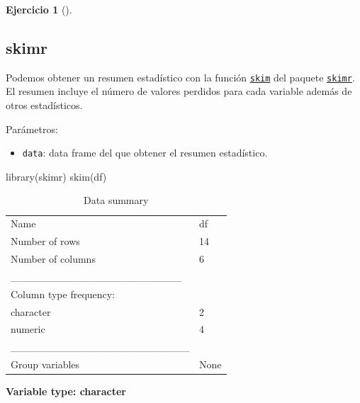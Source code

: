 \documentclass[
  spanish,
  a4paper,
]{scrreport}
\newenvironment{Shaded}{\begin{snugshade}}{\end{snugshade}}
\newcommand{\FunctionTok}[1]{\textcolor[rgb]{0.28,0.35,0.67}{#1}}
\newcommand{\NormalTok}[1]{\textcolor[rgb]{0.00,0.23,0.31}{#1}}
\providecommand{\tightlist}{%
  \setlength{\itemsep}{0pt}\setlength{\parskip}{0pt}}
\theoremstyle{definition}
\newtheorem{exercise}{Ejercicio}[chapter]
\theoremstyle{remark}
\begin{document}
\begin{exercise}[]
\begin{enumerate}
\begin{tcolorbox}
  \section{skimr}

  Podemos obtener un resumen estadístico con la función
  \href{https://www.rdocumentation.org/packages/skimr/versions/2.2.1/topics/skim}{\texttt{skim}}
  del paquete
  \href{https://www.rdocumentation.org/packages/skimr}{\texttt{skimr}}.
  El resumen incluye el número de valores perdidos para cada variable
  además de otros estadísticos.

  Parámetros:

  \begin{itemize}
  \tightlist
  \item
    \texttt{data}: data frame del que obtener el resumen estadístico.
  \end{itemize}

\begin{Shaded}
\begin{Highlighting}[]
\FunctionTok{library}\NormalTok{(skimr)}
\FunctionTok{skim}\NormalTok{(df)}
\end{Highlighting}
\end{Shaded}

  \begin{longtable}[]{@{}ll@{}}
  \caption{Data summary}\tabularnewline
  \toprule\noalign{}
  \endfirsthead
  \endhead
  \bottomrule\noalign{}
  \endlastfoot
  Name & df \\
  Number of rows & 14 \\
  Number of columns & 6 \\
  \_\_\_\_\_\_\_\_\_\_\_\_\_\_\_\_\_\_\_\_\_\_\_ & \\
  Column type frequency: & \\
  character & 2 \\
  numeric & 4 \\
  \_\_\_\_\_\_\_\_\_\_\_\_\_\_\_\_\_\_\_\_\_\_\_\_ & \\
  Group variables & None \\
  \end{longtable}

  \textbf{Variable type: character}


\end{tcolorbox}
\end{enumerate}
\end{exercise}
\end{document}
